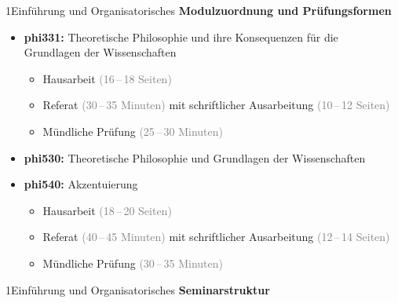 \documentclass[xcolor=table,9pt,aspectratio=169]{beamer}
\begin{document}
\begin{frame}{\vspace*{10mm}1\hspace*{1em}Einführung und Organisatorisches}
\textbf{Modulzuordnung und Prüfungsformen}\\
\begin{itemize}
   \item \textbf{phi331:} Theoretische Philosophie und ihre Konsequenzen für die\\Grundlagen der Wissenschaften
   \begin{itemize}
      \item Hausarbeit \textcolor{gray}{(16\,--\,18 Seiten)}
      \item Referat \textcolor{gray}{(30\,--\,35 Minuten)} mit schriftlicher Ausarbeitung \textcolor{gray}{(10\,--\,12 Seiten)}
      \item Mündliche Prüfung \textcolor{gray}{(25\,--\,30 Minuten)}
   \end{itemize}
   \item \textbf{phi530:} Theoretische Philosophie und Grundlagen der Wissenschaften
   \item \textbf{phi540:} Akzentuierung
   \begin{itemize}
      \item Hausarbeit \textcolor{gray}{(18\,--\,20 Seiten)}
      \item Referat \textcolor{gray}{(40\,--\,45 Minuten)} mit schriftlicher Ausarbeitung \textcolor{gray}{(12\,--\,14 Seiten)}
      \item Mündliche Prüfung \textcolor{gray}{(30\,--\,35 Minuten)}
   \end{itemize}
\end{itemize}
\end{frame}


\begin{frame}{\vspace*{10mm}1\hspace*{1em}Einführung und Organisatorisches}
\textbf{Seminarstruktur}\\
\begin{flushleft}
\end{flushleft}
\end{frame}
\end{document}
